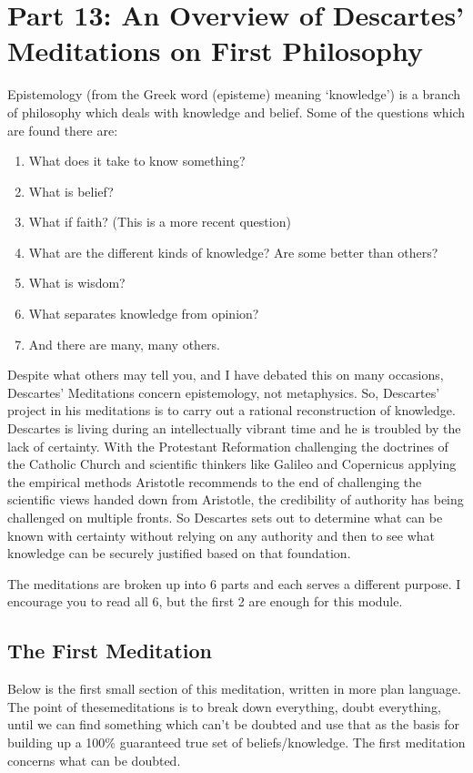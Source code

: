 \chapter{Part 13: An Overview of Descartes' Meditations on First Philosophy}

Epistemology (from the Greek word %
(epist\-em\-e) meaning ‘knowledge’) is a branch of philosophy which deals with knowledge and belief. Some of the questions which are found there are:
\begin{enumerate}
    \item What does it take to know something?
    \item What is belief?
    \item What if faith? (This is a more recent question)
    \item What are the different kinds of knowledge? Are some better than others?
    \item What is wisdom?
    \item What separates knowledge from opinion?
    \item And there are many, many others.
\end{enumerate}
Despite what others may tell you, and I have debated this on many occasions, Descartes' Meditations concern epistemology, not metaphysics. So, Descartes' project in his meditations is to carry out a rational reconstruction of knowledge. Descartes is living during an intellectually vibrant time and he is troubled by the lack of certainty. With the Protestant Reformation challenging the doctrines of the Catholic Church and scientific thinkers like Galileo and Copernicus applying the empirical methods Aristotle recommends to the end of challenging the scientific views handed down from Aristotle, the credibility of authority has being challenged on multiple fronts. So Descartes sets out to determine what can be known with certainty without relying on any authority and then to see what knowledge can be securely justified based on that foundation.

The meditations are broken up into 6 parts and each serves a different purpose. I encourage you to read all 6, but the first 2 are enough for this module.
\section{The First Meditation}
Below is the first small section of this meditation, written in more plan language. The point of thesemeditations is to break down everything, doubt everything, until we can find something which can’t be doubted and use that as the basis for building up a 100\% guaranteed true set of beliefs/knowledge. The first meditation concerns what can be doubted.


